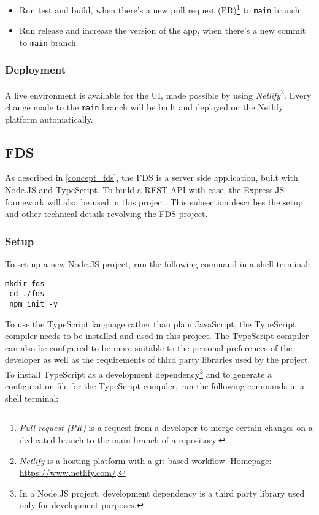    \begin{itemize}
    \item Run test and build, when there's a new pull request (PR)\footnote{\emph{Pull request (PR)} is a request from a developer to merge certain changes on a dedicated branch to the main branch of a repository.} to \verb;main; branch
    \item Run release and increase the version of the app, when there's a new commit to \verb;main; branch
   \end{itemize}
  
  \subsubsection{Deployment}
  A live environment is available for the UI, made possible by using \emph{Netlify}\footnote{\emph{Netlify} is a hosting platform with a git-based workflow. Homepage: \url{https://www.netlify.com/}.}. Every change made to the \verb;main; branch will be built and deployed on the Netlify platform automatically. 

 \subsection{FDS}
 As described in \autoref{concept_fds}, the FDS is a server side application, built with Node.JS and TypeScript. To build a REST API with ease, the Express.JS framework will also be used in this project. This subsection describes the setup and other technical details revolving the FDS project. 

  \subsubsection{Setup}
  To set up a new Node.JS project, run the following command in a shell terminal:

   \begin{lstlisting}[caption={Creating a new Node.JS program (Shell)}]
 mkdir fds
 cd ./fds
 npm init -y
   \end{lstlisting}
   
  To use the TypeScript language rather than plain JavaScript, the TypeScript compiler needs to be installed and used in this project. The TypeScript compiler can also be configured to be more suitable to the personal preferences of the developer as well as the requirements of third party libraries used by the project. To install TypeScript as a development dependency\footnote{In a Node.JS project, development dependency is a third party library used only for development purposes.} and to generate a configuration file for the TypeScript compiler, run the following commands in a shell terminal:
  
